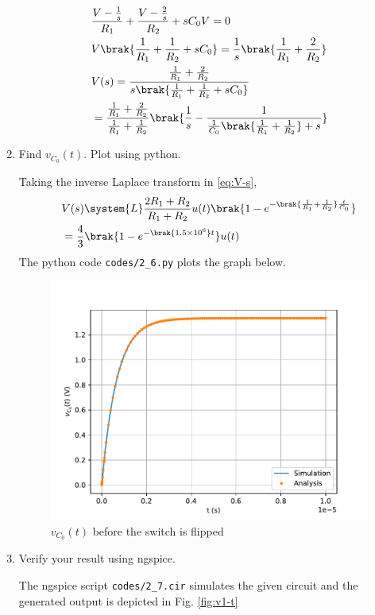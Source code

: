 \documentclass[journal,12pt,twocolumn]{IEEEtran}
\renewcommand\thesection{\arabic{section}}
\begin{document}
\begin{enumerate}[label=\arabic*.,ref=\thesection.\theenumi]
\begin{align}
    &\frac{V - \frac{1}{s}}{R_1} + \frac{V - \frac{2}{s}}{R_2} + sC_0V = 0 \\
    &V\brak{\frac{1}{R_1} + \frac{1}{R_2} + sC_0} = \frac{1}{s}\brak{\frac{1}{R_1} + \frac{2}{R_2}} \\
    &V(s) = \frac{\frac{1}{R_1} + \frac{2}{R_2}}{s\brak{\frac{1}{R_1} + \frac{1}{R_2} + sC_0}} \\
    &= \frac{\frac{1}{R_1} + \frac{2}{R_2}}{\frac{1}{R_1} + \frac{1}{R_2}}\brak{\frac{1}{s} - \frac{1}{\frac{1}{C_0}\brak{\frac{1}{R_1} + \frac{1}{R_2}} + s}} 
    \label{eq:V-s}
\end{align}
\item Find $v_{C_0}(t)$.  Plot using python.

\solution Taking the inverse Laplace transform in \eqref{eq:V-s},
\begin{align}
    &V(s) \system{L} \frac{2R_1 + R_2}{R_1 + R_2}u(t)\brak{1 - e^{-\brak{\frac{1}{R_1} + \frac{1}{R_2}}\frac{t}{C_0}}} \\
    &= \frac{4}{3}\brak{1 - e^{-\brak{1.5 \times 10^6}t}}u(t)
\end{align}
The python code \texttt{codes/2\_6.py} plots the graph below.
\begin{figure}[!htb]
    \includegraphics[width=\columnwidth]{figs/2_6.pdf}
    \caption{$v_{C_0}(t)$ before the switch is flipped}
    \label{fig:v1-t}
\end{figure}
\item Verify your result using ngspice.

\solution The ngspice script \texttt{codes/2\_7.cir} simulates the given circuit and the generated output is depicted in Fig. \eqref{fig:v1-t}
\end{enumerate}
\end{document}
